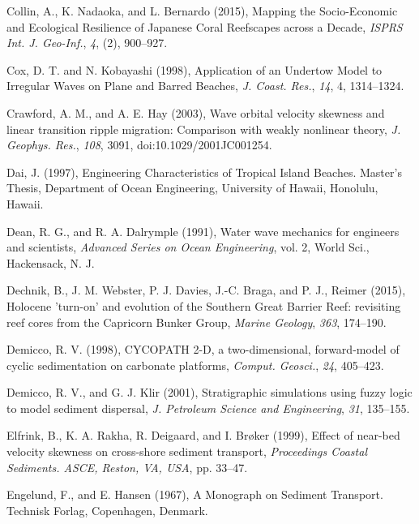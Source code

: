 \documentclass[default,jgrga]{agutex2015}
\begin{document}
\begin{article}
\begin{thebibliography}{}
Collin, A., K. Nadaoka, and L. Bernardo (2015), Mapping the Socio-Economic and Ecological Resilience of Japanese Coral Reefscapes across a Decade, \textit{ISPRS Int. J. Geo-Inf.}, \textit{4}, (2), 900--927.

Cox, D. T. and N. Kobayashi (1998), Application of an Undertow Model to Irregular Waves on Plane and Barred Beaches, \textit{J. Coast. Res.}, \textit{14}, 4, 1314--1324.

Crawford, A. M., and A. E. Hay (2003), Wave orbital velocity skewness and linear transition ripple migration: Comparison with weakly nonlinear theory, \textit{J. Geophys. Res.}, \textit{108}, 3091, doi:10.1029/2001JC001254.

Dai, J. (1997), Engineering Characteristics of Tropical Island Beaches. Master's Thesis, Department of Ocean Engineering, University of Hawaii, Honolulu, Hawaii.

Dean, R. G., and R. A. Dalrymple (1991), Water wave mechanics for engineers and scientists, \textit{Advanced Series on Ocean Engineering}, vol. 2, World Sci., Hackensack, N. J.

Dechnik, B., J. M. Webster, P. J. Davies, J.-C. Braga, and P. J., Reimer (2015), Holocene 'turn-on' and evolution of the Southern Great Barrier Reef: revisiting reef cores from the Capricorn Bunker Group, \textit{Marine Geology}, \textit{363}, 174--190.

Demicco, R. V. (1998), CYCOPATH 2-D, a two-dimensional, forward-model of cyclic sedimentation on carbonate platforms, \textit{Comput. Geosci.}, \textit{24}, 405--423.

Demicco, R. V., and G. J. Klir (2001), Stratigraphic simulations using fuzzy logic to model sediment dispersal, \textit{J. Petroleum Science and Engineering}, \textit{31}, 135--155.

Elfrink, B., K. A. Rakha, R. Deigaard, and I. Br{\o}ker (1999), Effect of near-bed velocity skewness on cross-shore sediment transport,  \textit{Proceedings Coastal Sediments. ASCE, Reston, VA, USA}, pp. 33--47.

Engelund, F., and E. Hansen (1967), A Monograph on Sediment Transport. Technisk Forlag, Copenhagen, Denmark.


\end{thebibliography}
\end{article}
\end{document}
